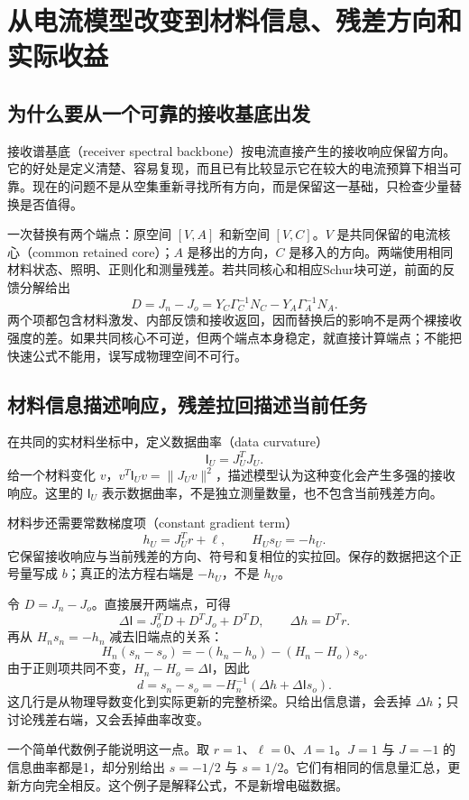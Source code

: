 \section{从电流模型改变到材料信息、残差方向和实际收益}
\subsection{为什么要从一个可靠的接收基底出发}
接收谱基底（receiver spectral backbone）按电流直接产生的接收响应保留方向。它的好处是定义清楚、容易复现，而且已有比较显示它在较大的电流预算下相当可靠。现在的问题不是从空集重新寻找所有方向，而是保留这一基础，只检查少量替换是否值得。

一次替换有两个端点：原空间 $[V,A]$ 和新空间 $[V,C]$。$V$ 是共同保留的电流核心（common retained core）；$A$ 是移出的方向，$C$ 是移入的方向。两端使用相同材料状态、照明、正则化和测量残差。若共同核心和相应Schur块可逆，前面的反馈分解给出
\[
 D=J_n-J_o=Y_C\Gamma_C^{-1}N_C-Y_A\Gamma_A^{-1}N_A.
\]
两个项都包含材料激发、内部反馈和接收返回，因而替换后的影响不是两个裸接收强度的差。如果共同核心不可逆，但两个端点本身稳定，就直接计算端点；不能把快速公式不能用，误写成物理空间不可行。

\subsection{材料信息描述响应，残差拉回描述当前任务}
在共同的实材料坐标中，定义数据曲率（data curvature）
\[
 \mathsf I_U=J_U^TJ_U.
\]
给一个材料变化 $v$，$v^T\mathsf I_Uv=\|J_Uv\|^2$，描述模型认为这种变化会产生多强的接收响应。这里的 $\mathsf I_U$ 表示数据曲率，不是独立测量数量，也不包含当前残差方向。

材料步还需要常数梯度项（constant gradient term）
\[
 h_U=J_U^Tr+\ell,\qquad H_Us_U=-h_U.
\]
它保留接收响应与当前残差的方向、符号和复相位的实拉回。保存的数据把这个正号量写成 $b$；真正的法方程右端是 $-h_U$，不是 $h_U$。

令 $D=J_n-J_o$。直接展开两端点，可得
\[
 \Delta\mathsf I=J_o^TD+D^TJ_o+D^TD,
 \qquad \Delta h=D^Tr.
\]
再从 $H_ns_n=-h_n$ 减去旧端点的关系：
\[
 H_n(s_n-s_o)=-(h_n-h_o)-(H_n-H_o)s_o.
\]
由于正则项共同不变，$H_n-H_o=\Delta\mathsf I$，因此
\[
 \boxed{d=s_n-s_o=-H_n^{-1}(\Delta h+\Delta\mathsf I s_o).}
\]
这几行是从物理导数变化到实际更新的完整桥梁。只给出信息谱，会丢掉 $\Delta h$；只讨论残差右端，又会丢掉曲率改变。

一个简单代数例子能说明这一点。取 $r=1$、$\ell=0$、$\Lambda=1$。$J=1$ 与 $J=-1$ 的信息曲率都是1，却分别给出 $s=-1/2$ 与 $s=1/2$。它们有相同的信息量汇总，更新方向完全相反。这个例子是解释公式，不是新增电磁数据。

